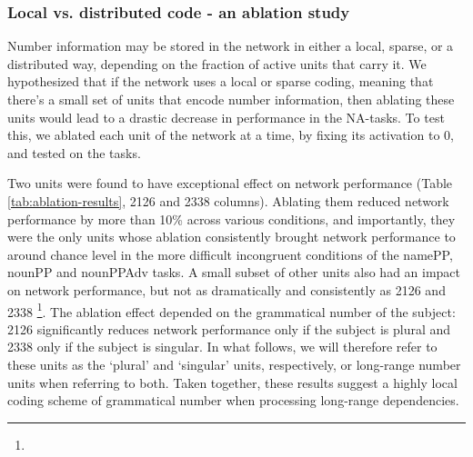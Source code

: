 
\subsubsection{Local vs. distributed code - an ablation study}
Number information may be stored in the network in either a local,
sparse, or a distributed way, depending on the fraction of active
units that carry it.  We hypothesized that if the network uses a local
or sparse coding, meaning that there's a small set of units that
encode number information, then ablating these units would lead to a
drastic decrease in performance in the NA-tasks.  To test this, we
ablated each unit of the network at a time, by fixing its activation
to 0, and tested on the tasks.

Two units were found to have exceptional effect on network performance
(Table \ref{tab:ablation-results}, \unit{2}{126} and \unit{2}{338}
columns). Ablating them reduced network performance by more than 10\%
across various conditions, and importantly, they were the only units
whose ablation consistently brought network performance to around
chance level in the more difficult incongruent conditions of the
namePP, nounPP and nounPPAdv tasks. A small subset of other units
also had an impact on network performance, but not as dramatically and
consistently as \unit{2}{126} and \unit{2}{338}
\footnote{}. The ablation effect depended on the
grammatical number of the subject: \unit{2}{126} significantly reduces
network performance only if the subject is plural and \unit{2}{338}
only if the subject is singular. In what follows, we will therefore
refer to these units as the `plural' and `singular' units, respectively,
or long-range number units when referring to both. Taken
together, these results suggest a highly local coding scheme of
grammatical number when processing long-range dependencies.

